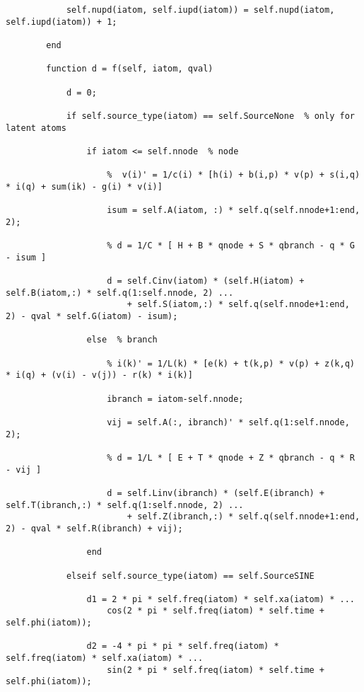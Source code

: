 \begin{lstlisting}
            self.nupd(iatom, self.iupd(iatom)) = self.nupd(iatom, self.iupd(iatom)) + 1;
             
        end
        
        function d = f(self, iatom, qval)
            
            d = 0;
            
            if self.source_type(iatom) == self.SourceNone  % only for latent atoms

                if iatom <= self.nnode  % node

                    %  v(i)' = 1/c(i) * [h(i) + b(i,p) * v(p) + s(i,q) * i(q) + sum(ik) - g(i) * v(i)]

                    isum = self.A(iatom, :) * self.q(self.nnode+1:end, 2);

                    % d = 1/C * [ H + B * qnode + S * qbranch - q * G - isum ] 
                    
                    d = self.Cinv(iatom) * (self.H(iatom) + self.B(iatom,:) * self.q(1:self.nnode, 2) ...
                        + self.S(iatom,:) * self.q(self.nnode+1:end, 2) - qval * self.G(iatom) - isum);

                else  % branch

                    % i(k)' = 1/L(k) * [e(k) + t(k,p) * v(p) + z(k,q) * i(q) + (v(i) - v(j)) - r(k) * i(k)]

                    ibranch = iatom-self.nnode;

                    vij = self.A(:, ibranch)' * self.q(1:self.nnode, 2);
                    
                    % d = 1/L * [ E + T * qnode + Z * qbranch - q * R - vij ] 

                    d = self.Linv(ibranch) * (self.E(ibranch) + self.T(ibranch,:) * self.q(1:self.nnode, 2) ...
                        + self.Z(ibranch,:) * self.q(self.nnode+1:end, 2) - qval * self.R(ibranch) + vij);

                end
                
            elseif self.source_type(iatom) == self.SourceSINE
                
                d1 = 2 * pi * self.freq(iatom) * self.xa(iatom) * ...
                    cos(2 * pi * self.freq(iatom) * self.time + self.phi(iatom));
                
                d2 = -4 * pi * pi * self.freq(iatom) * self.freq(iatom) * self.xa(iatom) * ...
                    sin(2 * pi * self.freq(iatom) * self.time + self.phi(iatom));
                

\end{lstlisting}

